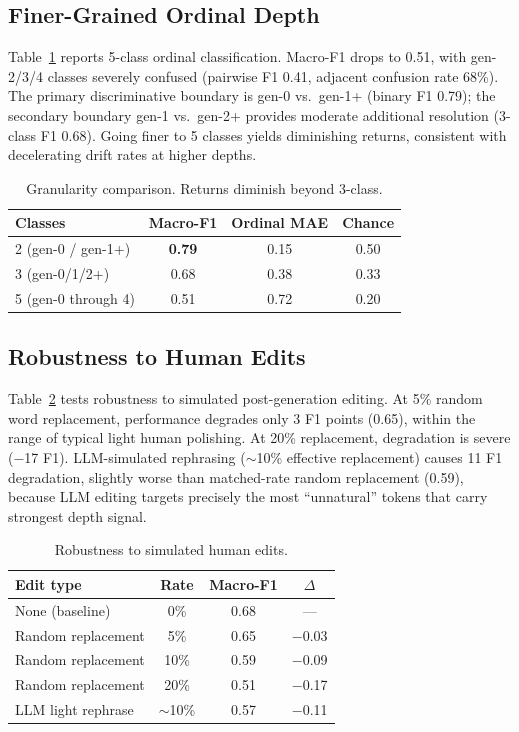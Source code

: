 \documentclass[letterpaper,11pt]{article}
\begin{document}
\subsection{Finer-Grained Ordinal Depth}
\label{sec:ordinal}

Table~\ref{tab:ordinal} reports 5-class ordinal classification. Macro-F1 drops to 0.51, with gen-2/3/4 classes severely confused (pairwise F1 0.41, adjacent confusion rate 68\%). The primary discriminative boundary is gen-0 vs.\ gen-1+ (binary F1 0.79); the secondary boundary gen-1 vs.\ gen-2+ provides moderate additional resolution (3-class F1 0.68). Going finer to 5 classes yields diminishing returns, consistent with decelerating drift rates at higher depths.

\begin{table}[t]
\centering
\caption{Granularity comparison. Returns diminish beyond 3-class.}
\label{tab:ordinal}
\small
\begin{tabular}{lccc}
\toprule
Classes & Macro-F1 & Ordinal MAE & Chance \\
\midrule
2 (gen-0 / gen-1+) & \textbf{0.79} & 0.15 & 0.50 \\
3 (gen-0/1/2+) & 0.68 & 0.38 & 0.33 \\
5 (gen-0 through 4) & 0.51 & 0.72 & 0.20 \\
\bottomrule
\end{tabular}
\end{table}

\subsection{Robustness to Human Edits}
\label{sec:robustness}

Table~\ref{tab:robust} tests robustness to simulated post-generation editing. At 5\% random word replacement, performance degrades only 3 F1 points (0.65), within the range of typical light human polishing. At 20\% replacement, degradation is severe ($-$17 F1). LLM-simulated rephrasing ($\sim$10\% effective replacement) causes 11 F1 degradation, slightly worse than matched-rate random replacement (0.59), because LLM editing targets precisely the most ``unnatural'' tokens that carry strongest depth signal.

\begin{table}[t]
\centering
\caption{Robustness to simulated human edits.}
\label{tab:robust}
\small
\begin{tabular}{lccc}
\toprule
Edit type & Rate & Macro-F1 & $\Delta$ \\
\midrule
None (baseline) & 0\% & 0.68 & --- \\
Random replacement & 5\% & 0.65 & $-$0.03 \\
Random replacement & 10\% & 0.59 & $-$0.09 \\
Random replacement & 20\% & 0.51 & $-$0.17 \\
LLM light rephrase & $\sim$10\% & 0.57 & $-$0.11 \\
\bottomrule
\end{tabular}
\end{table}
\end{document}
